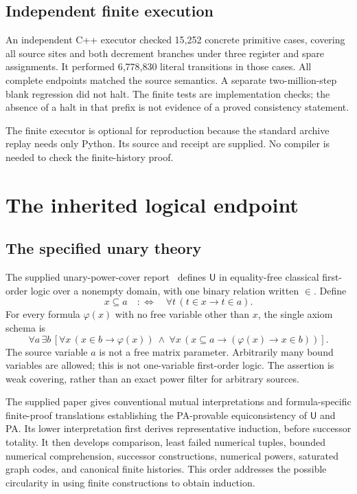 \documentclass[11pt,letterpaper]{article}
\newcommand{\UU}{\mathsf U}
\begin{document}
\subsection{Independent finite execution}
An independent C++ executor checked 15,252 concrete primitive cases,
covering all source sites and both decrement branches under three register
and spare assignments. It performed 6,778,830 literal transitions in those
cases. All complete endpoints matched the source semantics.
A separate two-million-step blank regression did not halt.
The finite tests are implementation checks; the absence of a halt in that
prefix is not evidence of a proved consistency statement.

The finite executor is optional for reproduction because the standard
archive replay needs only Python. Its source and receipt are supplied.
No compiler is needed to check the finite-history proof.

\section{The inherited logical endpoint}\label{sec:calibration}
\subsection{The specified unary theory}
The supplied unary-power-cover report~\cite{unary} defines $\UU$ in
equality-free classical first-order logic over a nonempty domain, with one
binary relation written $\in$. Define
\[
 x\subseteq a\quad:\Longleftrightarrow\quad
 \forall t\,(t\in x\longrightarrow t\in a).
\]
For every formula $\varphi(x)$ with no free variable other than $x$, the
single axiom schema is
\[
 \forall a\,\exists b\,
 \left[
   \forall x\,(x\in b\longrightarrow\varphi(x))
   \ \land\
   \forall x\,(x\subseteq a\longrightarrow
                         (\varphi(x)\longrightarrow x\in b))
 \right].
\]
The source variable $a$ is not a free matrix parameter. Arbitrarily many
bound variables are allowed; this is not one-variable first-order logic.
The assertion is weak covering, rather than an exact power filter for
arbitrary sources.

The supplied paper gives conventional mutual interpretations and
formula-specific finite-proof translations establishing the PA-provable
equiconsistency of $\UU$ and PA. Its lower interpretation first derives
representative induction, before successor totality. It then develops
comparison, least failed numerical tuples, bounded numerical comprehension,
successor constructions, numerical powers, saturated graph codes, and
canonical finite histories. This order addresses the possible circularity
in using finite constructions to obtain induction.
\end{document}
